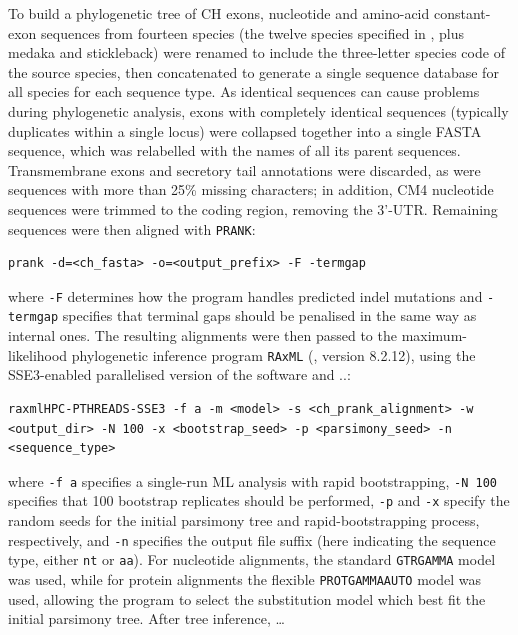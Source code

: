 To build a phylogenetic tree of CH exons, nucleotide and amino-acid constant-exon sequences from fourteen species (the twelve species specified in , plus medaka and stickleback) were renamed to include the three-letter species code of the source species, then concatenated to generate a single sequence database for all species for each sequence type. As identical sequences can cause problems during phylogenetic analysis, exons with completely identical sequences (typically duplicates within a single locus) were collapsed together into a single FASTA sequence, which was relabelled with the names of all its parent sequences. Transmembrane exons and secretory tail annotations were discarded, as were sequences with more than 25\% missing characters; in addition, CM4 nucleotide sequences were trimmed to the coding region, removing the 3'-UTR. Remaining sequences were then aligned with \lstinline{PRANK}:

\begin{lstlisting}
prank -d=<ch_fasta> -o=<output_prefix> -F -termgap
\end{lstlisting}

where \lstinline{-F} determines how the program handles predicted indel mutations and \lstinline{-termgap} specifies that terminal gaps should be penalised in the same way as internal ones. The resulting alignments were then passed to the maximum-likelihood phylogenetic inference program \lstinline{RAxML} (\citep{stamatakis2005raxml3,stamatakis2006raxml6,stamatakis2014raxml8}, version 8.2.12), using the SSE3-enabled parallelised version of the software and ..:

\begin{lstlisting}
raxmlHPC-PTHREADS-SSE3 -f a -m <model> -s <ch_prank_alignment> -w <output_dir> -N 100 -x <bootstrap_seed> -p <parsimony_seed> -n <sequence_type>
\end{lstlisting}

where \lstinline{-f a} specifies a single-run ML analysis with rapid bootstrapping, \lstinline{-N 100} specifies that 100 bootstrap replicates should be performed, \lstinline{-p} and \lstinline{-x} specify the random seeds for the initial parsimony tree and rapid-bootstrapping process, respectively, and  \lstinline{-n} specifies the output file suffix (here indicating the sequence type, either \lstinline{nt} or \lstinline{aa}). For nucleotide alignments, the standard \lstinline{GTRGAMMA} model was used, while for protein alignments the flexible \lstinline{PROTGAMMAAUTO} model was used, allowing the program to select the substitution model which best fit the initial parsimony tree. After tree inference, \dots %

